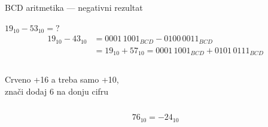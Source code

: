 \begin{frame}[label=06-s007]{BCD aritmetika — negativni rezultat}

$19_{10}-53_{10}={?}$
\[\begin{aligned}19_{10}-43_{10}&=0001\,1001_{BCD}-0100\,0011_{BCD}\\&=19_{10}+57_{10}=0001\,1001_{BCD}+0101\,0111_{BCD}\end{aligned}\]
\begin{columns}[c,onlytextwidth]\centering{}Crveno +16 a treba samo +10,\\znači dodaj 6 na donju cifru\end{columns}
\[76_{10}=-24_{10}\]
\end{frame}
